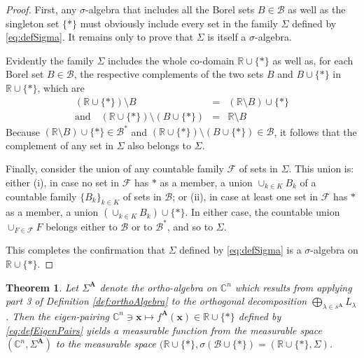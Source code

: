 \documentclass[11pt]{article}
\newcommand \R { \mathbb{R} }
\newcommand \C { \mathbb{C} }
\newtheorem{theorem}{Theorem}[section]
\begin{document}
\begin{proof}
	First, any $ \sigma $-algebra that includes all the Borel sets $B \in \mathcal B$ 
	as well as the singleton set $ \{*\} $ must obviously include every set 
	in the family $ \Sigma $ defined by \eqref{eq:defSigma}.
	It remains only to prove that $ \Sigma $ is itself a $ \sigma $-algebra.
	
	Evidently the family $ \Sigma $ includes the whole co-domain $ \R \cup \{ * \} $ 
	as well as, for each Borel set $B \in \mathcal B$, the respective complements 
	of the two sets $B$ and $B \cup \{*\} $ in $ \R \cup \{ * \} $, which are
\begin{equation}
\begin{array} {rcl}
	( \R \cup \{ * \} ) \setminus B &=& ( \R \setminus B) \cup \{ * \} \\
	\text{and} \quad ( \R \cup \{ * \} ) \setminus (B \cup \{*\} ) &=& \R \setminus B
\end{array}
\end{equation}
	Because $( \R \setminus B) \cup \{ * \} \in \mathcal B^* $
	and $( \R \cup \{ * \} ) \setminus (B \cup \{*\} ) \in \mathcal B$,
	it follows that the complement of any set in $ \Sigma $ also belongs to $ \Sigma $.
	
	Finally, consider the union of any countable family $ \mathcal F$ of sets in $ \Sigma $.
	This union is: either (i), in case no set in $ \mathcal F$ has $*$ as a member, 
	a union $ \cup _{k \in K} B_k $ of a countable family $ \{ B_k \}_{k \in K} $
	of sets in $ \mathcal B$;
	or (ii), in case at least one set in $ \mathcal F$ has $*$ as a member,
	a union $ \left ( \cup _{k \in K} B_k \right) \cup \{*\} $.
	In either case, the countable union $ \cup _{F \in \mathcal F} F$ 
	belongs either to $ \mathcal B$ or to $ \mathcal B^* $, and so to $ \Sigma $.
	
	This completes the confirmation that $ \Sigma $ defined by \eqref{eq:defSigma}
	is a $ \sigma $-algebra on $ \R \cup \{ * \} $.
\end{proof}

\begin{theorem}
	Let $ \Sigma ^{ \mathbf A} $ denote the ortho-algebra on $ \C^n $ 
	which results from applying part 3 of Definition \ref{def:orthoAlgebra}
	to the orthogonal decomposition $ \bigoplus _{ \lambda \in s^{ \mathbf A} } L_\lambda $.
	Then the eigen-pairing 
 \( \C^n \owns \mathbf x \mapsto f^{ \mathbf A} ( \mathbf x) \in \R \cup \{*\} \)
	defined by \eqref{eq:defEigenPairs} yields a measurable function
	from the measurable space $( \C^n, \Sigma ^{ \mathbf A} )$ to the measurable space 
 \( ( \R \cup \{*\}, \sigma ( \mathcal B \cup \{*\} ) = ( \R \cup \{*\}, \Sigma ) \).
\end{theorem}
\end{document}
